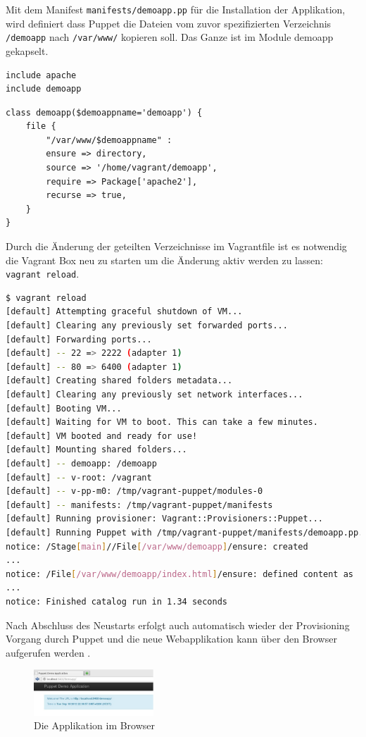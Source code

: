 \documentclass[12pt,a4paper,ngerman]{article}
\begin{document}
Mit dem Manifest \lstinline$manifests/demoapp.pp$ für die Installation der Applikation, wird definiert dass Puppet die Dateien vom zuvor spezifizierten Verzeichnis \lstinline$/demoapp$ nach \lstinline$/var/www/$ kopieren soll. Das Ganze ist im Module demoapp gekapselt.
\begin{lstlisting}[language=puppet,caption=Puppet Manifest für die Applikation, label=puppetdemoapp]
include apache
include demoapp
\end{lstlisting}

\begin{lstlisting}[language=puppet,caption=Puppet Module demoapp,label=puppet-demo-module]
class demoapp($demoappname='demoapp') {
    file {
        "/var/www/$demoappname" :
        ensure => directory,
        source => '/home/vagrant/demoapp',
        require => Package['apache2'],
        recurse => true,
    }
}
\end{lstlisting}


Durch die Änderung der geteilten Verzeichnisse im Vagrantfile ist es notwendig die Vagrant Box neu zu starten um die Änderung aktiv werden zu lassen:  \lstinline$vagrant reload$.
\begin{lstlisting}[language=sh,caption=Puppet reload mit Provisioning der Applikation, label=reloaddemoapp]
$ vagrant reload
[default] Attempting graceful shutdown of VM...
[default] Clearing any previously set forwarded ports...
[default] Forwarding ports...
[default] -- 22 => 2222 (adapter 1)
[default] -- 80 => 6400 (adapter 1)
[default] Creating shared folders metadata...
[default] Clearing any previously set network interfaces...
[default] Booting VM...
[default] Waiting for VM to boot. This can take a few minutes.
[default] VM booted and ready for use!
[default] Mounting shared folders...
[default] -- demoapp: /demoapp
[default] -- v-root: /vagrant
[default] -- v-pp-m0: /tmp/vagrant-puppet/modules-0
[default] -- manifests: /tmp/vagrant-puppet/manifests
[default] Running provisioner: Vagrant::Provisioners::Puppet...
[default] Running Puppet with /tmp/vagrant-puppet/manifests/demoapp.pp...
notice: /Stage[main]//File[/var/www/demoapp]/ensure: created
...
notice: /File[/var/www/demoapp/index.html]/ensure: defined content as '{md5}90a8d419b9c7b43b09ba73abebaf8f4c'
...
notice: Finished catalog run in 1.34 seconds
\end{lstlisting}

Nach Abschluss des Neustarts erfolgt auch automatisch wieder der Provisioning Vorgang durch Puppet und die neue Webapplikation kann über den Browser aufgerufen werden .
\begin{figure}
  \begin{center}
    \includegraphics[width=0.4\textwidth]{images/demoapp.pdf}
  \end{center}
  \caption{Die Applikation im Browser}
  \label{demoapp}
\end{figure}
\end{document}
